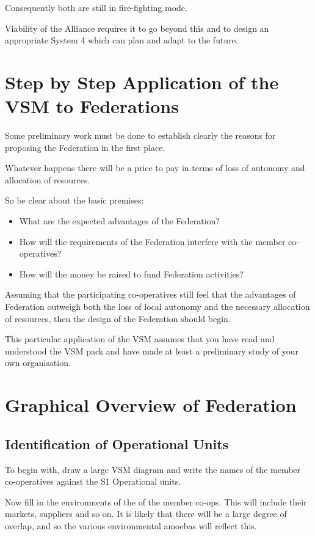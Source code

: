 Consequently both are still in fire-fighting mode.

Viability of the Alliance requires it to go beyond this and to design an appropriate System 4 which can plan and adapt to the future.

\section*{Step by Step Application of the VSM to Federations}
Some preliminary work must be done to establish clearly the reasons for proposing the Federation in the first place.

Whatever happens there will be a price to pay in terms of loss of autonomy and allocation of resources.

So be clear about the basic premises:

\begin{itemize}
  \item What are the expected advantages of the Federation?

  \item How will the requirements of the Federation interfere with the member co-operatives?

  \item How will the money be raised to fund Federation activities?

\end{itemize}

Assuming that the participating co-operatives still feel that the advantages of Federation outweigh both the loss of local autonomy and the necessary allocation of resources, then the design of the Federation should begin.

This particular application of the VSM assumes that you have read and understood the VSM pack and have made at least a preliminary study of your own organisation.

\section*{Graphical Overview of Federation}

\subsection*{Identification of Operational Units}
To begin with, draw a large VSM diagram and write the names of the member co-operatives against the S1 Operational units.

Now fill in the environments of the of the member co-ops. This will include their markets, suppliers and so on. It is likely that there will be a large degree of overlap, and so the various environmental amoebas will reflect this.

